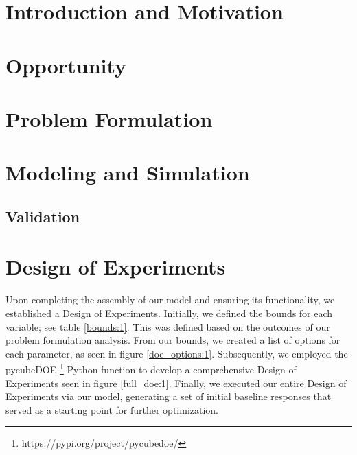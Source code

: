 \documentclass[balance,upint,subscriptcorrection,varvw,mathalfa=cal=boondoxo,spanish,french,vietnamese,russian,greek,pdf-a,colorlinks]{asmeconf}
\begin{document}





\section{Introduction and Motivation}

\section{Opportunity}

\section{Problem Formulation}

\section{Modeling and Simulation}

\subsection{Validation}

\section{Design of Experiments}

Upon completing the assembly of our model and ensuring its functionality, we established a Design of Experiments. Initially, we defined the bounds for each variable; see table \ref{bounds:1}. This was defined based on the outcomes of our problem formulation analysis. From our bounds, we created a list of options for each parameter, as seen in figure \ref{doe_options:1}. Subsequently, we employed the pycubeDOE \footnote{https://pypi.org/project/pycubedoe/} Python function to develop a comprehensive Design of Experiments seen in figure \ref{full_doe:1}. Finally, we executed our entire Design of Experiments via our model, generating a set of initial baseline responses that served as a starting point for further optimization.
\end{document}
